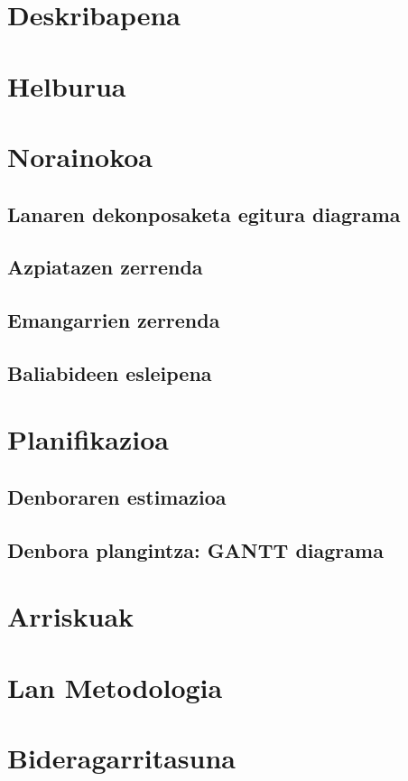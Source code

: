 
\section{Deskribapena}

\section{Helburua}

\section{Norainokoa}

\subsection{Lanaren dekonposaketa egitura diagrama}

\subsection{Azpiatazen zerrenda}

\subsection{Emangarrien zerrenda}

\subsection{Baliabideen esleipena}

\section{Planifikazioa}

\subsection{Denboraren estimazioa}

\subsection{Denbora plangintza: GANTT diagrama}

\section{Arriskuak}

\section{Lan Metodologia}

\section{Bideragarritasuna}